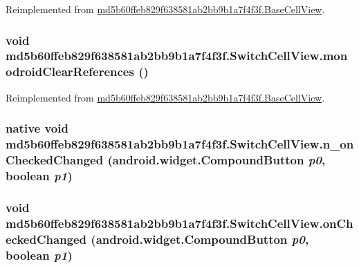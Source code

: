 Reimplemented from \hyperlink{classmd5b60ffeb829f638581ab2bb9b1a7f4f3f_1_1_base_cell_view_7064411ae8713f07abf9855828ab5d7a}{md5b60ffeb829f638581ab2bb9b1a7f4f3f.BaseCellView}.\hypertarget{classmd5b60ffeb829f638581ab2bb9b1a7f4f3f_1_1_switch_cell_view_c5c13d6e582a1a4005ce2de3fba31e9e}{
\subsubsection[{monodroidClearReferences}]{\setlength{\rightskip}{0pt plus 5cm}void md5b60ffeb829f638581ab2bb9b1a7f4f3f.SwitchCellView.monodroidClearReferences ()}}
\label{classmd5b60ffeb829f638581ab2bb9b1a7f4f3f_1_1_switch_cell_view_c5c13d6e582a1a4005ce2de3fba31e9e}




Reimplemented from \hyperlink{classmd5b60ffeb829f638581ab2bb9b1a7f4f3f_1_1_base_cell_view_bd00d7bfaf56776cb2df98366ee775d7}{md5b60ffeb829f638581ab2bb9b1a7f4f3f.BaseCellView}.\hypertarget{classmd5b60ffeb829f638581ab2bb9b1a7f4f3f_1_1_switch_cell_view_2b93ae01c4c3137f968f18538c1858d8}{
\subsubsection[{n\_\-onCheckedChanged}]{\setlength{\rightskip}{0pt plus 5cm}native void md5b60ffeb829f638581ab2bb9b1a7f4f3f.SwitchCellView.n\_\-onCheckedChanged (android.widget.CompoundButton {\em p0}, \/  boolean {\em p1})}}
\label{classmd5b60ffeb829f638581ab2bb9b1a7f4f3f_1_1_switch_cell_view_2b93ae01c4c3137f968f18538c1858d8}


\hypertarget{classmd5b60ffeb829f638581ab2bb9b1a7f4f3f_1_1_switch_cell_view_a03e11d93abb9b4b5c3b933f310b2a1e}{
\subsubsection[{onCheckedChanged}]{\setlength{\rightskip}{0pt plus 5cm}void md5b60ffeb829f638581ab2bb9b1a7f4f3f.SwitchCellView.onCheckedChanged (android.widget.CompoundButton {\em p0}, \/  boolean {\em p1})}}
\label{classmd5b60ffeb829f638581ab2bb9b1a7f4f3f_1_1_switch_cell_view_a03e11d93abb9b4b5c3b933f310b2a1e}




